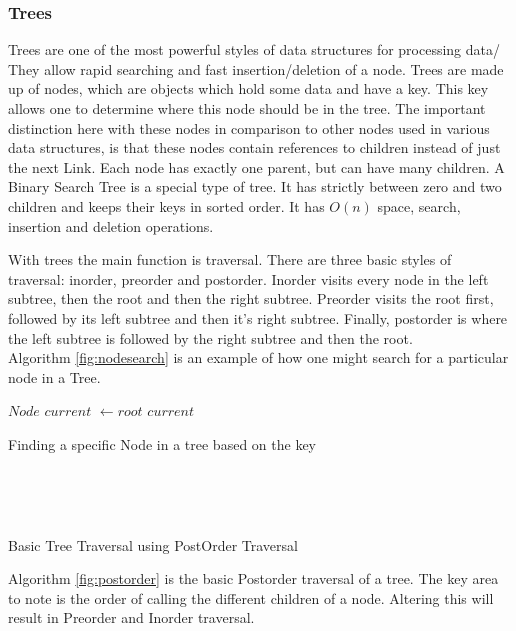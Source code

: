 \documentclass[10pt,twocolumn,hidelinks]{IEEEtran}
\begin{document}
	\subsubsection{Trees}
	Trees are one of the most powerful styles of data structures for processing data/ They allow rapid searching and fast insertion/deletion of a node. Trees are made up of nodes, which are objects which hold some data and have a key. This key allows one to determine where this node should be in the tree. The important distinction here with these nodes in comparison to other nodes used in various data structures, is that these nodes contain references to children instead of just the next Link. Each node has exactly one parent, but can have many children. A Binary Search Tree is a special type of tree. It has strictly between zero and two children and keeps their keys in sorted order. It has $O(n)$ space, search, insertion and deletion operations. 
	\par With trees the main function is traversal. There are three basic styles of traversal: inorder, preorder and postorder. Inorder visits every node in the left subtree, then the root and then the right subtree. Preorder visits the root first, followed by its left subtree and then it's right subtree. Finally, postorder is where the left subtree is followed by the right subtree and then the root. \\
Algorithm \ref{fig:nodesearch} is an example of how one might search for a particular node in a Tree.\\
\IncMargin{1em}
\begin{algorithm}
	\LinesNumbered
	$Node$ $current$ $\longleftarrow root$\;
\Return $current$\;
\caption{Finding a specific Node in a tree based on the key}
\label{fig:nodesearch}
\end{algorithm}\DecMargin{1em}
\\
\IncMargin{1em}
\begin{algorithm}
\SetAlgoNoLine
\LinesNumbered
	\Indm{}\\
\caption{Basic Tree Traversal using PostOrder Traversal}
\label{fig:postorder}
\end{algorithm}\DecMargin{1em}
\par Algorithm \ref{fig:postorder} is the basic Postorder traversal of a tree. The key area to note is the order of calling the different children of a node. Altering this will result in Preorder and Inorder traversal.
\end{document}
